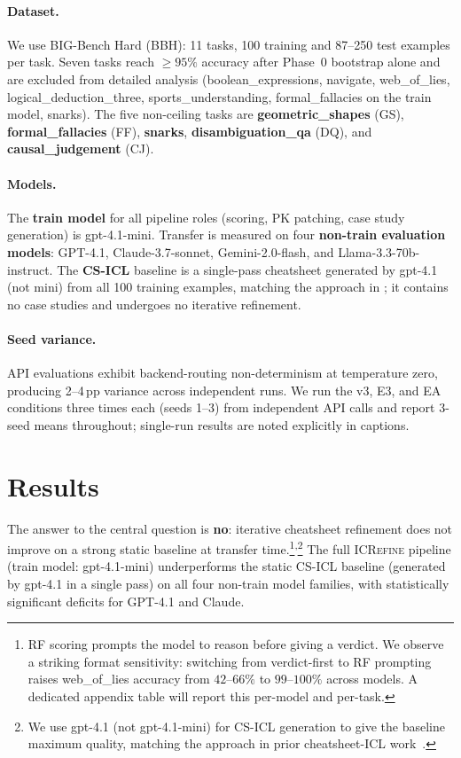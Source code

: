 \documentclass{article}
\begin{document}
\paragraph{Dataset.}
We use BIG-Bench Hard (BBH): 11 tasks, 100 training and 87--250 test examples per task.
Seven tasks reach $\geq 95\%$ accuracy after Phase~0 bootstrap alone and are excluded from
detailed analysis (boolean\_expressions, navigate, web\_of\_lies, logical\_deduction\_three,
sports\_understanding, formal\_fallacies on the train model, snarks).
The five non-ceiling tasks are \textbf{geometric\_shapes} (GS),
\textbf{formal\_fallacies} (FF), \textbf{snarks}, \textbf{disambiguation\_qa} (DQ),
and \textbf{causal\_judgement} (CJ).

\paragraph{Models.}
The \textbf{train model} for all pipeline roles (scoring, PK patching, case study generation)
is gpt-4.1-mini.
Transfer is measured on four \textbf{non-train evaluation models}: GPT-4.1, Claude-3.7-sonnet,
Gemini-2.0-flash, and Llama-3.3-70b-instruct.
The \textbf{CS-ICL} baseline is a single-pass cheatsheet generated by gpt-4.1 (not mini)
from all 100 training examples, matching the approach in \citet{csicl2024}; it contains no
case studies and undergoes no iterative refinement.

\paragraph{Seed variance.}
API evaluations exhibit backend-routing non-determinism at temperature zero, producing 2--4\,pp
variance across independent runs.
We run the v3, E3, and EA conditions three times each (seeds 1--3) from independent API calls
and report 3-seed means throughout; single-run results are noted explicitly in captions.



\section{Results}
\label{sec:results}

The answer to the central question is \textbf{no}: iterative cheatsheet refinement does not improve on a
strong static baseline at transfer time.\footnote{RF
scoring prompts the model to reason before giving a verdict. We observe a striking
format sensitivity: switching from verdict-first to RF prompting raises web\_of\_lies
accuracy from $42$--$66\%$ to $99$--$100\%$ across models. A dedicated appendix table
will report this per-model and per-task.}\textsuperscript{,}\footnote{We use gpt-4.1 (not gpt-4.1-mini)
for CS-ICL generation to give the baseline maximum quality, matching the approach in prior
cheatsheet-ICL work~\cite{csicl2024}.}
The full \textsc{ICRefine} pipeline (train model: gpt-4.1-mini) underperforms the static
CS-ICL baseline (generated by gpt-4.1 in a single pass) on all four non-train model families,
with statistically significant deficits for GPT-4.1 and Claude.
\end{document}
